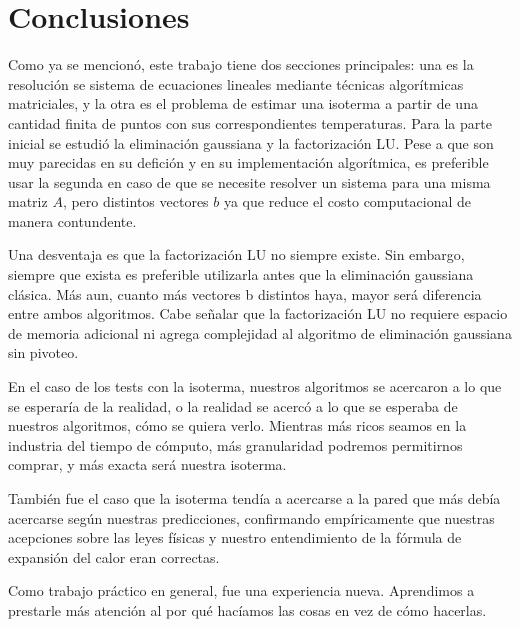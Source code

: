 \section{Conclusiones}
Como ya se mencionó, este trabajo tiene dos secciones principales: una es la resolución se sistema de 
ecuaciones lineales mediante técnicas algorítmicas matriciales, y la otra es el problema de estimar una 
isoterma a partir de una cantidad finita de puntos con sus correspondientes temperaturas. Para la parte 
inicial se estudió la eliminación gaussiana y la factorización LU. Pese a que son muy 
parecidas en su defición y en su implementación algorítmica, es preferible usar la segunda en caso
de que se necesite resolver un sistema para una misma matriz $A$, pero distintos vectores $b$ 
ya que reduce el costo computacional de manera contundente. 

Una desventaja es que la factorización LU no siempre existe. Sin embargo, siempre que exista es
preferible utilizarla antes que la eliminación gaussiana clásica. Más aun, cuanto más vectores 
b distintos haya, mayor será diferencia entre ambos algoritmos. Cabe señalar que la factorización LU no 
requiere espacio de memoria adicional ni agrega complejidad al algoritmo de eliminación gaussiana sin pivoteo.

En el caso de los tests con la isoterma, nuestros algoritmos se acercaron a lo que se esperaría de
la realidad, o la realidad se acercó a lo que se esperaba de nuestros algoritmos, cómo se quiera
verlo. Mientras más ricos seamos en la industria del tiempo de cómputo, más granularidad podremos
permitirnos comprar, y más exacta será nuestra isoterma.

También fue el caso que la isoterma tendía a acercarse a la pared que más debía acercarse según
nuestras predicciones, confirmando empíricamente que nuestras acepciones sobre las leyes físicas y
nuestro entendimiento de la fórmula de expansión del calor eran correctas.

Como trabajo práctico en general, fue una experiencia nueva. Aprendimos a prestarle más atención al
por qué hacíamos las cosas en vez de cómo hacerlas.




